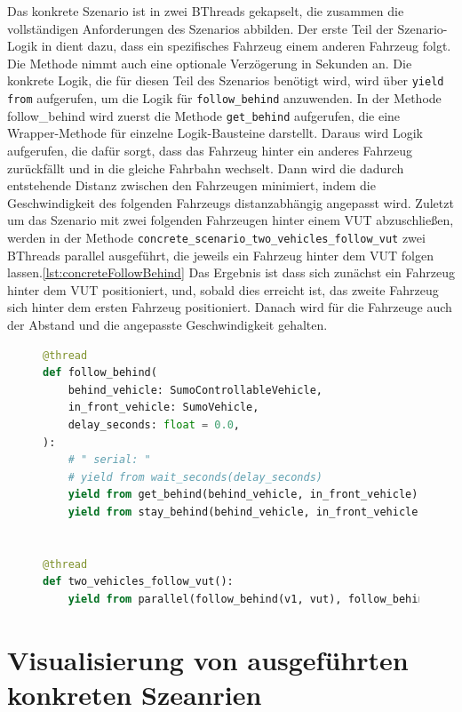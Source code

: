 Das konkrete Szenario ist in zwei BThreads gekapselt, die zusammen die vollständigen Anforderungen des Szenarios abbilden. Der erste Teil der Szenario-Logik in dient dazu, dass ein spezifisches Fahrzeug einem anderen Fahrzeug folgt. Die Methode nimmt auch eine optionale Verzögerung in Sekunden an.
Die konkrete Logik, die für diesen Teil des Szenarios benötigt wird, wird über \texttt{yield from} aufgerufen, um die Logik für \texttt{follow\_behind} anzuwenden. In der Methode follow\_behind wird zuerst die Methode \texttt{get\_behind} aufgerufen, die eine Wrapper-Methode für einzelne Logik-Bausteine darstellt.
Daraus wird Logik aufgerufen, die dafür sorgt, dass das Fahrzeug hinter ein anderes Fahrzeug zurückfällt und in die gleiche Fahrbahn wechselt. Dann wird die dadurch entstehende Distanz zwischen den Fahrzeugen minimiert, indem die Geschwindigkeit des folgenden Fahrzeugs distanzabhängig angepasst wird.
Zuletzt um das Szenario mit zwei folgenden Fahrzeugen hinter einem VUT abzuschließen, werden in der Methode \texttt{concrete\_scenario\_two\_vehicles\_follow\_vut} zwei BThreads parallel ausgeführt, die jeweils ein Fahrzeug hinter dem VUT folgen lassen.\ref{lst:concreteFollowBehind}
Das Ergebnis ist dass sich zunächst ein Fahrzeug hinter dem VUT positioniert, und, sobald dies erreicht ist, das zweite Fahrzeug sich hinter dem ersten Fahrzeug positioniert. Danach wird für die Fahrzeuge auch der Abstand und die angepasste Geschwindigkeit gehalten.
\begin{figure}[ht]
\begin{lstlisting}[language=Python, caption=Konkretes Szenario: Zwei Fahrzeuge folgen dem VUT - Relevante BThreads, basicstyle=\ttfamily\small, label={lst:concreteFollowBehind}]
@thread
def follow_behind(
    behind_vehicle: SumoControllableVehicle,
    in_front_vehicle: SumoVehicle,
    delay_seconds: float = 0.0,
):
    # " serial: "
    # yield from wait_seconds(delay_seconds)
    yield from get_behind(behind_vehicle, in_front_vehicle)
    yield from stay_behind(behind_vehicle, in_front_vehicle)


@thread
def two_vehicles_follow_vut():
    yield from parallel(follow_behind(v1, vut), follow_behind(v2, v1))
\end{lstlisting}
\end{figure}
\clearpage

\section{Visualisierung von ausgeführten konkreten Szeanrien}
